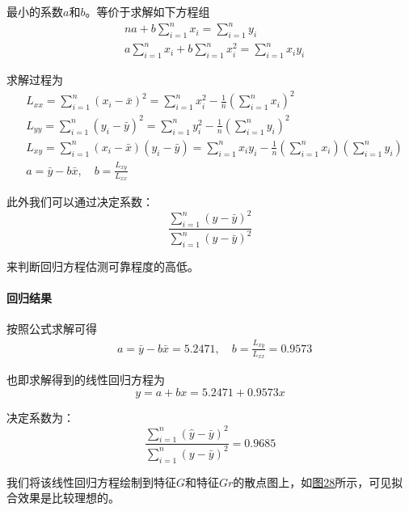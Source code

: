 \documentclass[UTF8]{ctexart}
\begin{document}
	最小的系数$a$和$b$。等价于求解如下方程组
	\begin{align*}
	& na + b\sum\limits_{i=1}^{n}x_i = \sum\limits_{i=1}^{n}y_i \\
	& a\sum\limits_{i=1}^{n}x_i + b\sum\limits_{i=1}^{n}x_i^2 = \sum\limits_{i=1}^{n}x_iy_i
	\end{align*}
	
	求解过程为
	\begin{align*}
	& L_{xx} = \sum\limits_{i=1}^{n}(x_i - \bar{x})^2 = \sum\limits_{i=1}^{n}x_i^2 - \frac{1}{n}(\sum\limits_{i=1}^{n}x_i)^2 \\
	& L_{yy} = \sum\limits_{i=1}^{n}(y_i - \bar{y})^2 = \sum\limits_{i=1}^{n}y_i^2 - \frac{1}{n}(\sum\limits_{i=1}^{n}y_i)^2 \\
	& L_{xy} = \sum\limits_{i=1}^{n}(x_i - \bar{x})(y_i - \bar{y}) = \sum\limits_{i=1}^{n}x_iy_i - \frac{1}{n}(\sum\limits_{i=1}^{n}x_i)(\sum\limits_{i=1}^{n}y_i) \\
	& a = \bar{y} - b\bar{x}, \quad b = \frac{L_{xy}}{L_{xx}}
	\end{align*}
	
	此外我们可以通过决定系数：
	\begin{equation*}
	\frac{\sum\limits_{i=1}^{n}(\hat{y} - \bar{y})^2}{\sum\limits_{i=1}^{n}(y - \bar{y})^2}
	\end{equation*}
	
	来判断回归方程估测可靠程度的高低。
	
	\paragraph{回归结果} 按照公式求解可得
	\begin{align*}
	& a = \bar{y} - b\bar{x} = 5.2471 , \quad b = \frac{L_{xy}}{L_{xx}} = 0.9573
	\end{align*}
	
	也即求解得到的线性回归方程为
	\begin{equation*}
	y = a + bx = 5.2471 + 0.9573x
	\end{equation*}
	
	决定系数为：
	\begin{equation*}
	\frac{\sum\limits_{i=1}^{n}(\hat{y} - \bar{y})^2}{\sum\limits_{i=1}^{n}(y - \bar{y})^2} = 0.9685
	\end{equation*}
	
	我们将该线性回归方程绘制到特征$G$和特征$Gr$的散点图上，如\hyperref[Fig.28]{图28}所示，可见拟合效果是比较理想的。
	
\end{document}
